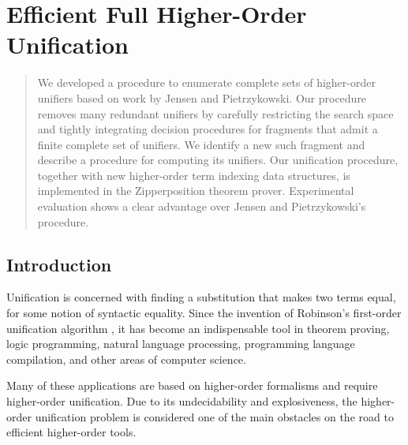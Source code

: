 \chapter{Efficient Full Higher-Order Unification}
\label{ch:unif}



\begin{abstract}
  We developed a procedure to enumerate complete sets of higher-order unifiers based on work
  by Jensen and Pietrzykowski. Our procedure removes many redundant unifiers by
  carefully restricting the search space and tightly integrating decision
  procedures for fragments that admit a finite complete set of unifiers. We
  identify a new such fragment and describe a procedure for computing its unifiers.
  Our unification procedure, together with new higher-order term indexing data structures, 
  is implemented in the Zipperposition theorem prover.
  Experimental evaluation shows a clear advantage over Jensen and Pietrzykowski's
  procedure.    
\end{abstract}
    
\newpage

\section{Introduction}
\label{sec:unif:intro}

Unification is concerned with finding a substitution that makes two terms
equal, for some notion of syntactic equality. Since the invention of Robinson's first-order unification
algorithm \cite{ar-65-resolution}, it has become an indispensable
tool in theorem proving, logic
programming, natural language processing, programming language compilation, and other areas of computer science.

Many of these applications are based on higher-order formalisms and require
higher-order unification. Due to its undecidability and explosiveness,
the higher-order unification problem is considered one of the main
obstacles on the road to efficient higher-order tools.

